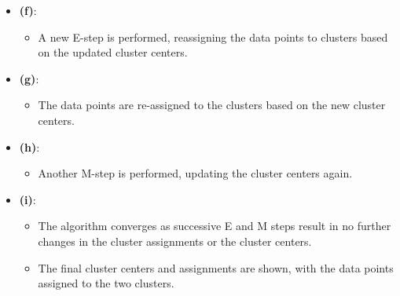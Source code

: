 \begin{example}
\begin{itemize}
        \item \textbf{(f)}:
        \begin{itemize}
            \item A new E-step is performed, reassigning the data points to clusters based on the updated cluster centers.
        \end{itemize}
        
        \item \textbf{(g)}:
        \begin{itemize}
            \item The data points are re-assigned to the clusters based on the new cluster centers.
        \end{itemize}
        
        \item \textbf{(h)}:
        \begin{itemize}
            \item Another M-step is performed, updating the cluster centers again.
        \end{itemize}
        
        \item \textbf{(i)}:
        \begin{itemize}
            \item The algorithm converges as successive E and M steps result in no further changes in the cluster assignments or the cluster centers.
            \item The final cluster centers and assignments are shown, with the data points assigned to the two clusters.
        \end{itemize}
    \end{itemize}
\end{example}

